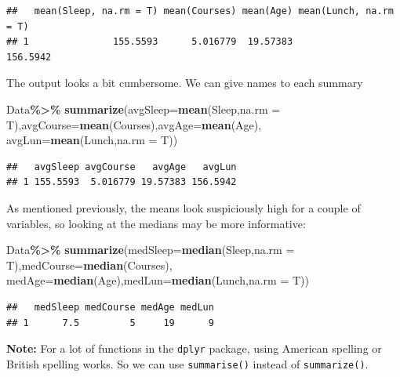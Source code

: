 \documentclass[
]{book}
\newenvironment{Shaded}{\begin{snugshade}}{\end{snugshade}}
\newcommand{\AttributeTok}[1]{\textcolor[rgb]{0.13,0.29,0.53}{#1}}
\newcommand{\FunctionTok}[1]{\textcolor[rgb]{0.13,0.29,0.53}{\textbf{#1}}}
\newcommand{\NormalTok}[1]{#1}
\newcommand{\SpecialCharTok}[1]{\textcolor[rgb]{0.81,0.36,0.00}{\textbf{#1}}}
\begin{document}
\begin{verbatim}
##   mean(Sleep, na.rm = T) mean(Courses) mean(Age) mean(Lunch, na.rm = T)
## 1               155.5593      5.016779  19.57383               156.5942
\end{verbatim}

The output looks a bit cumbersome. We can give names to each summary

\begin{Shaded}
\begin{Highlighting}[]
\NormalTok{Data}\SpecialCharTok{\%\textgreater{}\%}
  \FunctionTok{summarize}\NormalTok{(}\AttributeTok{avgSleep=}\FunctionTok{mean}\NormalTok{(Sleep,}\AttributeTok{na.rm =}\NormalTok{ T),}\AttributeTok{avgCourse=}\FunctionTok{mean}\NormalTok{(Courses),}\AttributeTok{avgAge=}\FunctionTok{mean}\NormalTok{(Age),}
            \AttributeTok{avgLun=}\FunctionTok{mean}\NormalTok{(Lunch,}\AttributeTok{na.rm =}\NormalTok{ T))}
\end{Highlighting}
\end{Shaded}

\begin{verbatim}
##   avgSleep avgCourse   avgAge   avgLun
## 1 155.5593  5.016779 19.57383 156.5942
\end{verbatim}

As mentioned previously, the means look suspiciously high for a couple of variables, so looking at the medians may be more informative:

\begin{Shaded}
\begin{Highlighting}[]
\NormalTok{Data}\SpecialCharTok{\%\textgreater{}\%}
  \FunctionTok{summarize}\NormalTok{(}\AttributeTok{medSleep=}\FunctionTok{median}\NormalTok{(Sleep,}\AttributeTok{na.rm =}\NormalTok{ T),}\AttributeTok{medCourse=}\FunctionTok{median}\NormalTok{(Courses),}
            \AttributeTok{medAge=}\FunctionTok{median}\NormalTok{(Age),}\AttributeTok{medLun=}\FunctionTok{median}\NormalTok{(Lunch,}\AttributeTok{na.rm =}\NormalTok{ T))}
\end{Highlighting}
\end{Shaded}

\begin{verbatim}
##   medSleep medCourse medAge medLun
## 1      7.5         5     19      9
\end{verbatim}

\textbf{Note:} For a lot of functions in the \texttt{dplyr} package, using American spelling or British spelling works. So we can use \texttt{summarise()} instead of \texttt{summarize()}.
\end{document}
